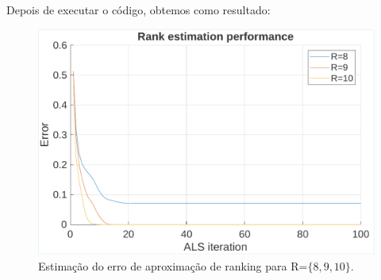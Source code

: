 	Depois de executar o código, obtemos como resultado: 
	
	\begin{figure}[h!]
		\centering
		\includegraphics[width=0.9\linewidth]{images/ALS_rank_estimation_cropped.pdf}
		\caption{Estimação do erro de aproximação de ranking para R=$\{8,9,10\}$.}
		\label{fig:ALS}
	\end{figure}
	
